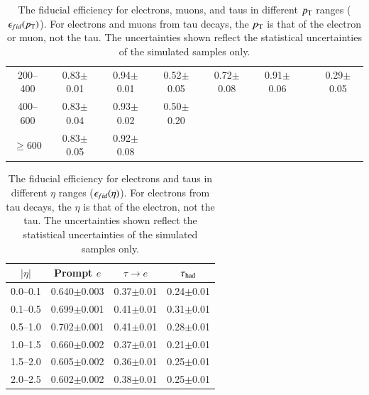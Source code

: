 \begin{table}[htbp]
\begin{center}
{\begin{tabular}{cccccccc}
200--400              & 0.83$\pm$0.01    & 0.94$\pm$0.01  & 0.52$\pm$0.05    & 0.72$\pm$0.08         & 0.91$\pm$0.06  &                   & 0.29$\pm$0.05\\ 
400--600              & 0.83$\pm$0.04    & 0.93$\pm$0.02  & 0.50$\pm$0.20    \\
$\ge 600$             & 0.83$\pm$0.05    & 0.92$\pm$0.08  &                  \\
 \hline \hline 
 \end{tabular} 
}
\caption{The fiducial efficiency for electrons, muons, and taus in different $p_{\text{T}}$ ranges ($\epsilon_{fid}(p_{\text{T}})$).  For electrons and muons from tau decays, the $p_{\text{T}}$ is that of the electron or muon, not the tau.  The uncertainties shown reflect the statistical uncertainties of the simulated samples only. }
 \label{table:model-independent-fideff-pt} 
 \end{center} 
 \end{table} 

\begin{table}[htbp]
\begin{center}
  {\small
 \begin{tabular}{cccc} 
 \hline \hline 
$|\eta|$ & Prompt $e$& $\tau\rightarrow e$& $\tau_\mathrm{had}$ \\ \hline 
0.0--0.1 & 0.640$\pm$0.003& 0.37$\pm$0.01&   0.24$\pm$0.01\\ 
0.1--0.5 & 0.699$\pm$0.001& 0.41$\pm$0.01&   0.31$\pm$0.01\\ 
0.5--1.0 & 0.702$\pm$0.001& 0.41$\pm$0.01&   0.28$\pm$0.01\\ 
1.0--1.5 & 0.660$\pm$0.002& 0.37$\pm$0.01&   0.21$\pm$0.01\\ 
1.5--2.0 & 0.605$\pm$0.002& 0.36$\pm$0.01&   0.25$\pm$0.01\\ 
2.0--2.5 & 0.602$\pm$0.002& 0.38$\pm$0.01&   0.25$\pm$0.01\\ 
 \hline \hline 
 \end{tabular} 
}
\caption{The fiducial efficiency for electrons and taus in different $\eta$ ranges ($\epsfid(\eta)$).  For electrons from tau decays, the $\eta$ is that of the electron, not the tau.  The uncertainties shown reflect the statistical uncertainties of the simulated samples only.}

 \label{table:model-independent-fideff-eta} 
 \end{center} 
 \end{table}

